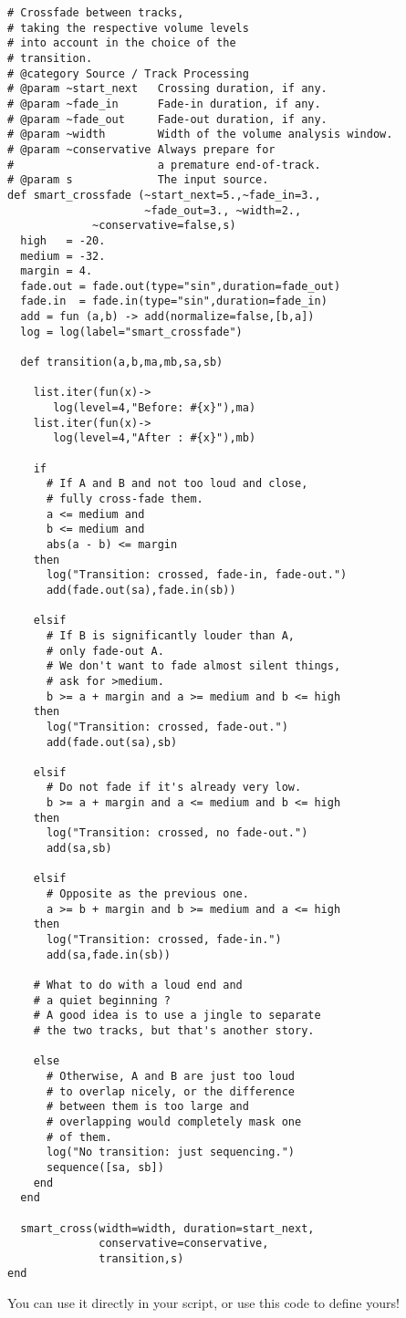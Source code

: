 \begin{verbatim}
# Crossfade between tracks, 
# taking the respective volume levels 
# into account in the choice of the 
# transition.
# @category Source / Track Processing
# @param ~start_next   Crossing duration, if any.
# @param ~fade_in      Fade-in duration, if any.
# @param ~fade_out     Fade-out duration, if any.
# @param ~width        Width of the volume analysis window.
# @param ~conservative Always prepare for
#                      a premature end-of-track.
# @param s             The input source.
def smart_crossfade (~start_next=5.,~fade_in=3.,
                     ~fade_out=3., ~width=2.,
		     ~conservative=false,s)
  high   = -20.
  medium = -32.
  margin = 4.
  fade.out = fade.out(type="sin",duration=fade_out)
  fade.in  = fade.in(type="sin",duration=fade_in)
  add = fun (a,b) -> add(normalize=false,[b,a])
  log = log(label="smart_crossfade")

  def transition(a,b,ma,mb,sa,sb)

    list.iter(fun(x)-> 
       log(level=4,"Before: #{x}"),ma)
    list.iter(fun(x)-> 
       log(level=4,"After : #{x}"),mb)

    if
      # If A and B and not too loud and close, 
      # fully cross-fade them.
      a <= medium and 
      b <= medium and 
      abs(a - b) <= margin
    then
      log("Transition: crossed, fade-in, fade-out.")
      add(fade.out(sa),fade.in(sb))

    elsif
      # If B is significantly louder than A, 
      # only fade-out A.
      # We don't want to fade almost silent things, 
      # ask for >medium.
      b >= a + margin and a >= medium and b <= high
    then
      log("Transition: crossed, fade-out.")
      add(fade.out(sa),sb)

    elsif
      # Do not fade if it's already very low.
      b >= a + margin and a <= medium and b <= high
    then
      log("Transition: crossed, no fade-out.")
      add(sa,sb)

    elsif
      # Opposite as the previous one.
      a >= b + margin and b >= medium and a <= high
    then
      log("Transition: crossed, fade-in.")
      add(sa,fade.in(sb))

    # What to do with a loud end and 
    # a quiet beginning ?
    # A good idea is to use a jingle to separate 
    # the two tracks, but that's another story.

    else
      # Otherwise, A and B are just too loud 
      # to overlap nicely, or the difference 
      # between them is too large and 
      # overlapping would completely mask one 
      # of them.
      log("No transition: just sequencing.")
      sequence([sa, sb])
    end
  end

  smart_cross(width=width, duration=start_next, 
              conservative=conservative,
              transition,s)
end
\end{verbatim}
You can use it directly in your script, or use this code to define yours!





